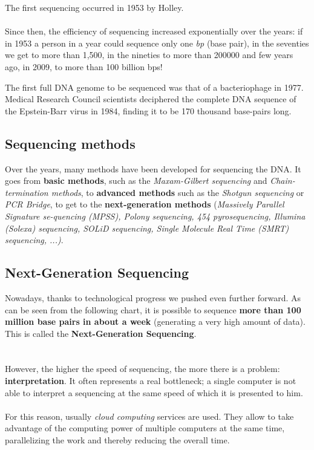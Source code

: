 The first sequencing occurred in 1953 by Holley.
\\
\\Since then, the efficiency of sequencing increased exponentially over the years: if in 1953 a person in a year could sequence only one \emph{bp} (base pair), in the seventies we get to more than 1,500, in the nineties to more than 200000 and few years ago, in 2009, to more than 100 billion bps!

\vspace{5mm}

The first full DNA genome to be sequenced was that of a bacteriophage in 1977. Medical Research Council scientists deciphered the complete DNA sequence of the Epstein-Barr virus in 1984, finding it to be 170 thousand base-pairs long.

\subsection{Sequencing methods}

Over the years, many methods have been developed for sequencing the DNA. It goes from \textbf{basic methods}, such as the \emph{Maxam-Gilbert sequencing} and \emph{Chain-termination methods}, to \textbf{advanced methods} such as the \emph{Shotgun sequencing} or \emph{PCR Bridge}, to get to the \textbf{next-generation methods} (\emph{Massively Parallel Signature se-quencing (MPSS), Polony sequencing, 454 pyrosequencing, Illumina (Solexa) sequencing, SOLiD sequencing, Single Molecule Real Time (SMRT) sequencing, ...)}.

\subsection{Next-Generation Sequencing}

Nowadays, thanks to technological progress we pushed even further forward. As can be seen from the following chart, it is possible to sequence \textbf{more than 100 million base pairs in about a week} (generating a very high amount of data). This is called the \textbf{Next-Generation Sequencing}.
\\
\\
\\However, the higher the speed of sequencing, the more there is a problem:  \textbf{interpretation}. It often represents a real bottleneck; a single computer is not able to interpret a sequencing at the same speed of which it is presented to him.
\\
\\For this reason, usually \emph{cloud computing} services are used. They allow to take advantage of the computing power of multiple computers at the same time, parallelizing the work and thereby reducing the overall time.

